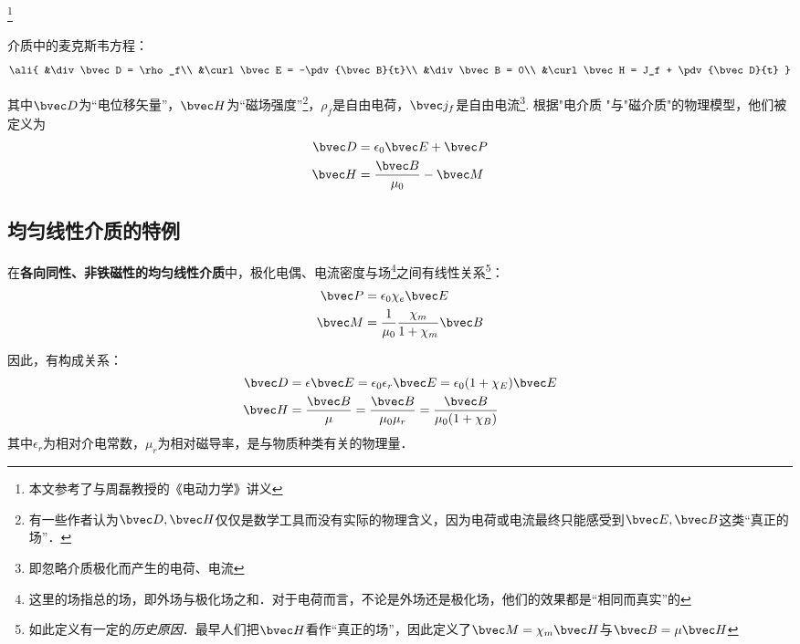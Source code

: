 
\footnote{本文参考了\cite{GriffE}与周磊教授的《电动力学》讲义}
\begin{issues}
\issueDraft
\end{issues}

介质中的麦克斯韦方程：
\begin{equation}\ali{
&\div\bvec D = \rho_f\\
&\curl\bvec E = -\pdv{\bvec B}{t}\\
&\div\bvec B = 0\\
&\curl\bvec H = J_f + \pdv{\bvec D}{t}
}\end{equation}

其中$\bvec D$为“电位移矢量”，$\bvec H$为“磁场强度”\footnote{有一些作者认为$\bvec D, \bvec H$仅仅是数学工具而没有实际的物理含义，因为电荷或电流最终只能感受到$\bvec E, \bvec B$这类“真正的场”．}，$\rho_f$是自由电荷，$\bvec j_f$是自由电流\footnote{即忽略介质极化而产生的电荷、电流}. 根据"电介质  "与"磁介质"的物理模型，他们被定义为
\begin{align}
\bvec D &= \epsilon_0 \bvec E + \bvec P\\
\bvec H &= \frac{\bvec B}{\mu_0} - \bvec M\\
\end{align}

\subsection{均匀线性介质的特例}
在\textbf{各向同性、非铁磁性的均匀线性介质}中，极化电偶、电流密度与场\footnote{这里的场指总的场，即外场与极化场之和．对于电荷而言，不论是外场还是极化场，他们的效果都是“相同而真实”的}之间有线性关系\footnote{如此定义有一定的\textsl{历史原因}．最早人们把$\bvec H$看作“真正的场”，因此定义了$\bvec M = \chi_m \bvec H$与$\bvec B = \mu \bvec H$}：
\begin{align}
\bvec P &= \epsilon_0 \chi_e \bvec E\\
\bvec M &= \frac{1}{\mu_0} \frac{\chi_m}{1+\chi_m}\bvec B\\
\end{align}

因此，有构成关系：
\begin{align}
\bvec D &= \epsilon \bvec E = \epsilon_0 \epsilon_r \bvec E = \epsilon_0(1 + \chi_E)\bvec E\\

\bvec H &= \frac{\bvec B}{\mu} = \frac{\bvec B}{\mu_0\mu_r} = \frac{\bvec B}{\mu_0(1 + \chi_B)}\\
\end{align}
其中$\epsilon_r$为相对介电常数，$\mu_r$为相对磁导率，是与物质种类有关的物理量．

